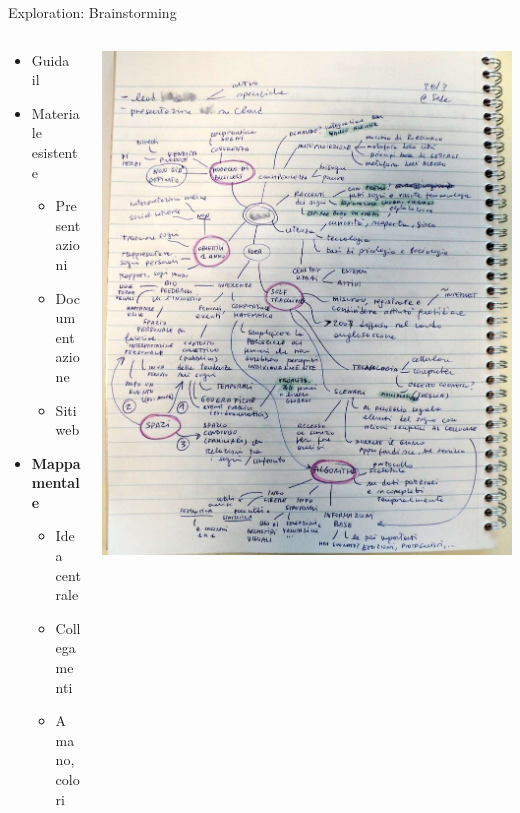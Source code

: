 	\begin{frame}{Exploration: Brainstorming}
		\begin{columns}[T]
		    \begin{column}{.5\textwidth}
				\begin{itemize}
					\item Guida il 
					\item Materiale esistente
					\begin{itemize}
						\item Presentazioni
						\item Documentazione
						\item Siti web
					\end{itemize}
				\end{itemize}	

				\begin{itemize}
					\item \textbf{Mappa mentale}
					\begin{itemize}
						\item Idea centrale
						\item Collegamenti
						\item A mano, colori
					\end{itemize}
				\end{itemize}
		    \end{column}
		    \begin{column}{.5\textwidth}
				\hspace*{-0.4cm} \includegraphics[scale=0.17]{images/mindmap-1}
		    \end{column}
		 \end{columns}
		

\end{frame}
